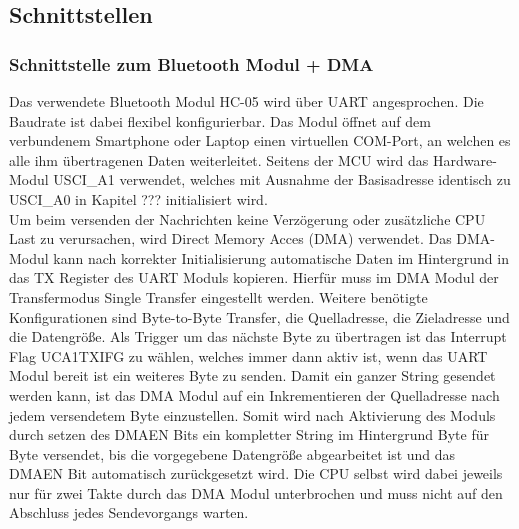 

\subsection{Schnittstellen}


\subsubsection{Schnittstelle zum Bluetooth Modul + DMA}

Das verwendete Bluetooth Modul HC-05 wird über UART angesprochen. Die Baudrate ist dabei flexibel konfigurierbar. Das Modul öffnet auf dem verbundenem Smartphone oder Laptop einen virtuellen COM-Port, an welchen es alle ihm übertragenen Daten weiterleitet. Seitens der MCU wird das Hardware-Modul USCI\_A1 verwendet, welches mit Ausnahme der Basisadresse identisch zu USCI\_A0 in Kapitel ??? initialisiert wird. \\

Um beim versenden der Nachrichten keine Verzögerung oder zusätzliche CPU Last zu verursachen, wird Direct Memory Acces (DMA) verwendet. Das DMA-Modul kann nach korrekter Initialisierung automatische Daten im Hintergrund in das TX Register des UART Moduls kopieren. Hierfür muss im DMA Modul der Transfermodus Single Transfer eingestellt werden. Weitere benötigte Konfigurationen sind Byte-to-Byte Transfer, die Quelladresse, die Zieladresse und die Datengröße. Als Trigger um das nächste Byte zu übertragen ist das Interrupt Flag UCA1TXIFG zu wählen, welches immer dann aktiv ist, wenn das UART Modul bereit ist ein weiteres Byte zu senden. Damit ein ganzer String gesendet werden kann, ist das DMA Modul auf ein Inkrementieren der Quelladresse nach jedem versendetem Byte einzustellen. Somit wird nach Aktivierung des Moduls durch setzen des DMAEN Bits ein kompletter String im Hintergrund Byte für Byte versendet, bis die vorgegebene Datengröße abgearbeitet ist und das DMAEN Bit automatisch zurückgesetzt wird. Die CPU selbst wird dabei jeweils nur für zwei Takte durch das DMA Modul unterbrochen und muss nicht auf den Abschluss jedes Sendevorgangs warten.